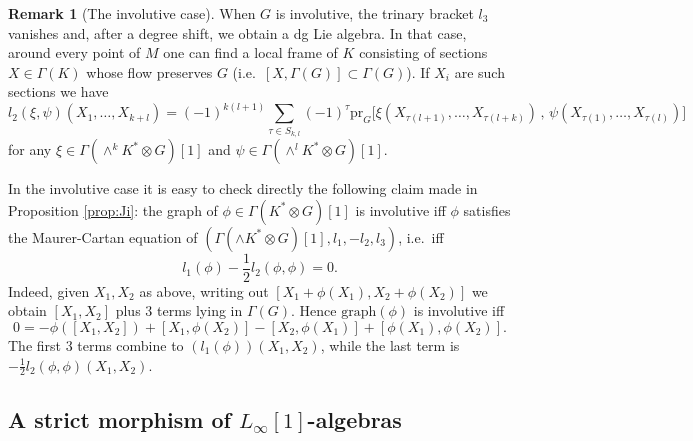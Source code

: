 \documentclass[11pt,thmsa]{amsart}
\theoremstyle{definition}
\newtheorem{remark}[theorem]{Remark}
\newcommand{\liones}{$L_{\infty}[1]$-algebras }
\begin{document}
\begin{remark}[The involutive case]
When $G$ is involutive, the trinary bracket $l_3$ vanishes and, after a degree shift, we obtain a dg Lie algebra.
In that case, {around every point of $M$ one can find a local frame of $K$ consisting of}  
sections $X\in \Gamma(K)$ whose flow preserves $G$ (i.e.~$[X,\Gamma(G)]\subset \Gamma(G)$).
If $X_i$ are such sections we have
$$ l_2(\xi,\psi)(X_1,\dots,X_{k+l})=(-1)^{k(l+1)}\sum_{\tau\in S_{k,l}}(-1)^{\tau} \mathrm{pr}_G\Big[\xi(
 X_{\tau(l+1)},\dots,X_{\tau(l+k)})\,,\,\psi(X_{\tau(1)},\dots,X_{\tau(l)})\Big]
$$
for any $\xi \in\Gamma(\wedge^k K^*\otimes G)[1]$ and $\psi \in\Gamma(\wedge^l K^*\otimes G)[1]$. 
 
In the involutive case it is easy to check directly the following claim made in Proposition \ref{prop:Ji}: 
the graph of $\phi\in \Gamma(K^*\otimes G)[1]$ is involutive if{f} $\phi$ satisfies the Maurer-Cartan equation of $(\Gamma(\wedge K^*\otimes G)[1],l_1,-l_2,l_3)$, i.e.~if{f}
$$l_1(\phi)-\frac{1}{2}l_2(\phi,\phi)=0.$$ Indeed, given $X_1,X_2$ as above, writing out $[X_1+\phi(X_1),X_2+\phi(X_2)]$
we obtain $[X_1,X_2]$ plus 3 terms lying in $\Gamma(G)$. Hence $\mathrm{graph}(\phi)$ is involutive if{f} 
 $$0=-\phi([X_1,X_2])+[X_1,\phi(X_2)]-[X_2,\phi(X_1)]+[\phi(X_1),\phi(X_2)].$$
 The first 3 terms combine to $(l_1(\phi))(X_1,X_2)$, while the last term is 
$-\frac{1}{2}l_2(\phi,\phi)(X_1,X_2)$. \end{remark}
  


\subsection{A strict morphism of \liones}
\label{subsection: strict morphism}
\end{document}
